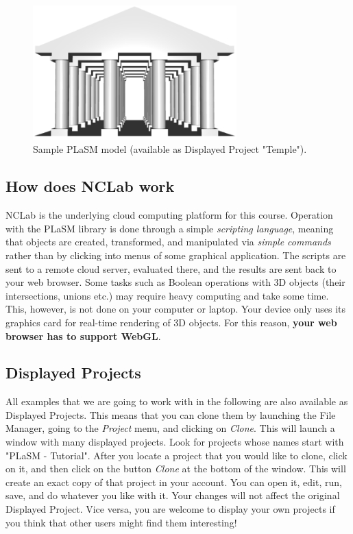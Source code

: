 \documentclass{article}
\begin{document}
\begin{figure}[!ht]
\begin{center}
\includegraphics[width=0.7\textwidth]{img/temple0.png}
\end{center}
\vspace{-4mm}
\caption{Sample PLaSM model (available as Displayed Project "Temple").}
\vspace{-1cm}
\label{fig:pisa}
\end{figure}
\newpage
\subsection{How does NCLab work}

NCLab is the underlying cloud computing platform for this course. Operation with the 
PLaSM library is done through a simple {\em scripting language}, meaning that  
objects are created, transformed, and manipulated via {\em simple commands} rather 
than by clicking into menus of some graphical application. The scripts are 
sent to a remote cloud server, evaluated there, and the results are sent back
to your web browser. Some tasks such as Boolean operations with 3D objects 
(their intersections, unions etc.) may require heavy computing and take some time.
This, however, is not done on your computer or laptop. Your device only uses 
its graphics card for real-time rendering of 3D objects. For this reason, {\bf your 
web browser has to support WebGL}.

\subsection{Displayed Projects}

All examples that we are going to work with in the following are also available 
as Displayed Projects. This means that you can clone them by launching the File
Manager, going to the {\em Project} menu, and clicking on {\em Clone}. This will 
launch a window with many displayed projects. Look for projects whose names start 
with "PLaSM - Tutorial". After you locate a project that you would like to clone, 
click on it, and then click on the button {\em Clone} at the bottom of the window. 
This will create an exact copy of that project in your account. You can open it,
edit, run, save, and do whatever you like with it. Your changes will not affect 
the original Displayed Project. Vice versa, you are welcome to display your own 
projects if you think that other users might find them interesting!
\end{document}
